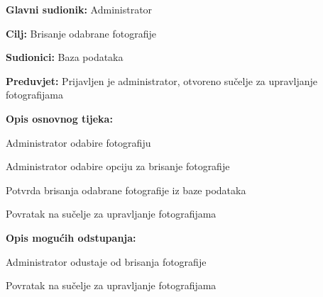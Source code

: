 					\noindent {}
					\begin{packed_item}
						
						\item \textbf{Glavni sudionik: }Administrator
						\item  \textbf{Cilj:} Brisanje odabrane fotografije
						\item  \textbf{Sudionici:} Baza podataka
						\item  \textbf{Preduvjet:} Prijavljen je administrator, otvoreno sučelje za upravljanje fotografijama
						\item  \textbf{Opis osnovnog tijeka:}
						
						\item[] \begin{packed_enum}
							
							\item Administrator odabire fotografiju
							\item Administrator odabire opciju za brisanje fotografije
							\item Potvrda brisanja odabrane fotografije iz baze podataka
							\item Povratak na sučelje za upravljanje fotografijama
						\end{packed_enum}
						
						\item  \textbf{Opis mogućih odstupanja:}
						
						\item[] \begin{packed_item}
							
							\item[4.a] Administrator odustaje od brisanja fotografije
							\item[] \begin{packed_enum}
								
								\item Povratak na sučelje za upravljanje fotografijama
								
							\end{packed_enum}
							
						\end{packed_item}
					\end{packed_item}
					
